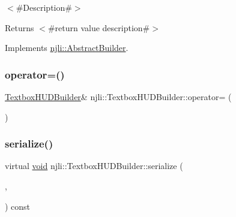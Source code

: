 $<$\#\+Description\#$>$

\begin{DoxyReturn}{Returns}
$<$\#return value description\#$>$ 
\end{DoxyReturn}


Implements \mbox{\hyperlink{classnjli_1_1_abstract_builder_a3e6e553e06d1ca30517ad5fb0bd4d000}{njli\+::\+Abstract\+Builder}}.

\mbox{\label{classnjli_1_1_textbox_h_u_d_builder_af73289cced2b3da90c4de8801d5c2246}} 
\subsubsection{\texorpdfstring{operator=()}{operator=()}}
{\footnotesize\ttfamily \mbox{\hyperlink{classnjli_1_1_textbox_h_u_d_builder}{Textbox\+H\+U\+D\+Builder}}\& njli\+::\+Textbox\+H\+U\+D\+Builder\+::operator= (\begin{DoxyParamCaption}\item[{const \mbox{\hyperlink{classnjli_1_1_textbox_h_u_d_builder}{Textbox\+H\+U\+D\+Builder}} \&}]{ }\end{DoxyParamCaption})\hspace{0.3cm}{\ttfamily [protected]}}

\mbox{\label{classnjli_1_1_textbox_h_u_d_builder_a948c1bf9ffa6f87cb52e737f85933a74}} 
\subsubsection{\texorpdfstring{serialize()}{serialize()}}
{\footnotesize\ttfamily virtual \mbox{\hyperlink{_thread_8h_af1e856da2e658414cb2456cb6f7ebc66}{void}} njli\+::\+Textbox\+H\+U\+D\+Builder\+::serialize (\begin{DoxyParamCaption}\item[{\mbox{\hyperlink{_thread_8h_af1e856da2e658414cb2456cb6f7ebc66}{void}} $\ast$}]{,  }\item[{bt\+Serializer $\ast$}]{ }\end{DoxyParamCaption}) const\hspace{0.3cm}{\ttfamily [virtual]}}

